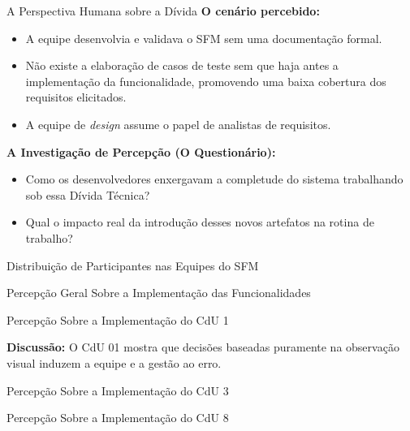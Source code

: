 \begin{frame}{A Perspectiva Humana sobre a Dívida}
  \textbf{O cenário percebido:}
  \begin{itemize}
    \item A equipe desenvolvia e validava o SFM sem uma documentação formal.
    \item Não existe a elaboração de casos de teste sem que haja antes a implementação da funcionalidade, promovendo uma baixa cobertura dos requisitos elicitados.
    \item A equipe de \textit{design} assume o papel de analistas de requisitos.
  \end{itemize}

  \vspace{1.0em}

  \textbf{A Investigação de Percepção (O Questionário):}
  \begin{itemize}
    \item Como os desenvolvedores enxergavam a completude do sistema trabalhando sob essa Dívida Técnica?
    \item Qual o impacto real da introdução desses novos artefatos na rotina de trabalho?
  \end{itemize}
\end{frame}

\begin{frame}{Distribuição de Participantes nas Equipes do SFM}
    
\end{frame}

\begin{frame}{Percepção Geral Sobre a Implementação das Funcionalidades}
     
\end{frame}

\begin{frame}{Percepção Sobre a Implementação do CdU 1}
    
    
    \textbf{Discussão:} O CdU 01 mostra que decisões baseadas puramente na observação visual induzem a equipe e a gestão ao erro. 
\end{frame}

\begin{frame}{Percepção Sobre a Implementação do CdU 3}
    
\end{frame}

\begin{frame}{Percepção Sobre a Implementação do CdU 8}
    
\end{frame}

